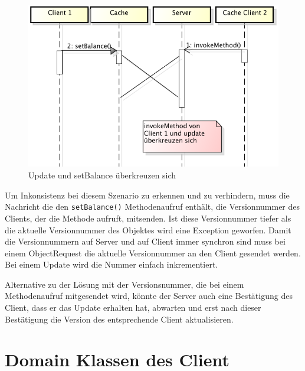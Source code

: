 \begin{figure}[h]
  \centering
\includegraphics[scale=0.3]{images_objectcaching/conflictCross}  
  \caption{Update und setBalance überkreuzen sich}
  \label{fig:messagecross}
\end{figure}


Um Inkonsistenz bei diesem Szenario zu erkennen und zu verhindern, muss die Nachricht die den \verb|setBalance()| Methodenaufruf enthält, die Versionnummer des Clients, der die Methode aufruft, mitsenden. Ist diese Versionnummer tiefer als die aktuelle Versionnummer des Objektes wird eine Exception geworfen. Damit die Versionnummern auf Server und auf Client immer synchron sind muss bei einem ObjectRequest die aktuelle Versionnummer an den Client gesendet werden. Bei einem Update wird die Nummer einfach inkrementiert.

Alternative zu der Lösung mit der Versionsnummer, die bei einem Methodenaufruf mitgesendet wird, könnte der Server auch eine Bestätigung des Client, dass er das Update erhalten hat, abwarten und erst nach dieser Bestätigung die Version des entsprechende Client aktualisieren.


\section{Domain Klassen des Client}
\label{sec:domain-klassen}

